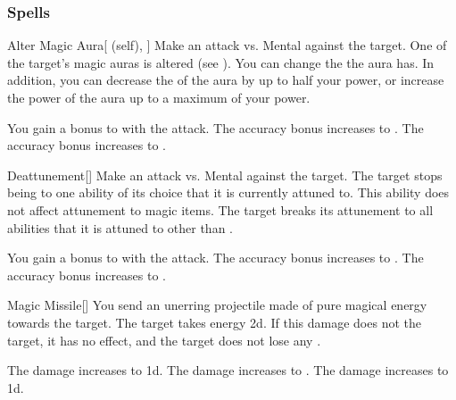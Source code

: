 \subsubsection{Spells}


\lowercase{\hypertarget{spell:Alter Magic Aura}{}}\label{spell:Alter Magic Aura}
\begin{attuneability}[Rank 1]{\hypertarget{spell:Alter Magic Aura}{Alter Magic Aura}}[ (self), ]
Make an attack vs. Mental against the target.
\hit One of the target's magic auras is altered (see ).
You can change the  the aura has.
In addition, you can decrease the  of the aura by up to half your power, or increase the power of the aura up to a maximum of your power.

\rankline
{} You gain a  bonus to  with the attack.
 The accuracy bonus increases to .
 The accuracy bonus increases to .
\end{attuneability}
\vspace{0.25em}



\lowercase{\hypertarget{spell:Deattunement}{}}\label{spell:Deattunement}
\begin{freeability}[Rank 1]{\hypertarget{spell:Deattunement}{Deattunement}}[]
Make an attack vs. Mental against the target.
\hit The target stops being  to one ability of its choice that it is currently attuned to.
This ability does not affect attunement to magic items.
\crit The target breaks its attunement to all abilities that it is attuned to other than .

\rankline
{} You gain a  bonus to  with the attack.
 The accuracy bonus increases to .
 The accuracy bonus increases to .
\end{freeability}
\vspace{0.25em}



\lowercase{\hypertarget{spell:Magic Missile}{}}\label{spell:Magic Missile}
\begin{freeability}[Rank 1]{\hypertarget{spell:Magic Missile}{Magic Missile}}[]
You send an unerring projectile made of pure magical energy towards the target.
The target takes energy  \minus2d.
If this damage does not  the target, it has no effect, and the target does not lose any .

\rankline
{} The damage increases to  \minus1d.
 The damage increases to .
 The damage increases to  \plus1d.
\end{freeability}
\vspace{0.25em}



